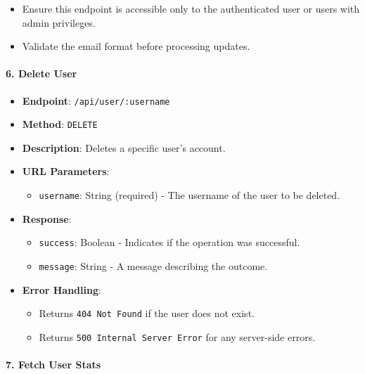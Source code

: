 \begin{itemize}
  \begin{itemize}
  \tightlist
  \item
    Ensure this endpoint is accessible only to the authenticated user or
    users with admin privileges.
  \item
    Validate the email format before processing updates.
  \end{itemize}
\end{itemize}

\hypertarget{delete-user}{%
\paragraph{6. Delete User}\label{delete-user}}

\begin{itemize}
\tightlist
\item
  \textbf{Endpoint}: \texttt{/api/user/:username}
\item
  \textbf{Method}: \texttt{DELETE}
\item
  \textbf{Description}: Deletes a specific user's account.
\item
  \textbf{URL Parameters}:

  \begin{itemize}
  \tightlist
  \item
    \texttt{username}: String (required) - The username of the user to
    be deleted.
  \end{itemize}
\item
  \textbf{Response}:

  \begin{itemize}
  \tightlist
  \item
    \texttt{success}: Boolean - Indicates if the operation was
    successful.
  \item
    \texttt{message}: String - A message describing the outcome.
  \end{itemize}
\item
  \textbf{Error Handling}:

  \begin{itemize}
  \tightlist
  \item
    Returns \texttt{404\ Not\ Found} if the user does not exist.
  \item
    Returns \texttt{500\ Internal\ Server\ Error} for any server-side
    errors.
  \end{itemize}
\end{itemize}

\hypertarget{fetch-user-stats}{%
\paragraph{7. Fetch User Stats}\label{fetch-user-stats}}


